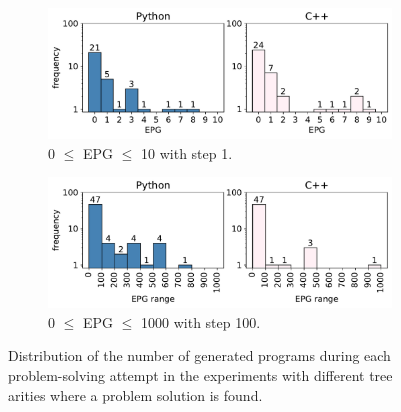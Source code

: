 \begin{figure}
\begin{subfigure}{\columnwidth}
\centering
\includegraphics[width=.7\linewidth, trim={0mm 4mm 0mm 0mm}]{images/epg_distribution_solved_maxprog_1000_1_v3_zenodo.pdf}
  \caption{0 $\leq$ EPG $\leq$ 10 with step 1.}
  \label{fig:seidr:epg-distrib-solved-10}
\end{subfigure}


\begin{subfigure}{\columnwidth}
\centering
\includegraphics[width=.7\linewidth, trim={0mm 4mm 0mm 0mm}]{images/epg_distribution_solved_maxprog_1000_100_v3_zenodo.pdf}
  \caption{0 $\leq$ EPG $\leq$ 1000 with step 100.}
  \label{fig:seidr:epg-distrib-solved-100}
\end{subfigure}
\caption{Distribution of the number of generated programs during each problem-solving attempt in the experiments with different tree arities where a problem solution is found.}
\label{fig:seidr:epg-distribution}
\end{figure}

